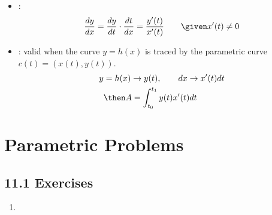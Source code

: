\begin{itemize}
  \item {}:
    \[%
      \frac{dy}{dx}  = \frac{dy}{dt} \cdot \frac{dt}{dx} = \frac{y'(t)}{x'(t)}
      \qquad \given x'(t) \neq 0
    \]%

  \item {}: valid when the curve \(y = h(x)\)
    is traced  by the parametric curve \(c(t) = (x(t), y(t))\).
    \begin{align*}
      y &= h(x) \to y(t), \qquad  dx \to x'(t) dt \\
      &\then A = \int_{t_0}^{t_1}  y(t)x'(t) dt
    \end{align*}


\end{itemize}

\section{Parametric Problems}
\subsection{11.1 Exercises}
\begin{enumerate}[itemsep=3em]
  \item
\end{enumerate}
